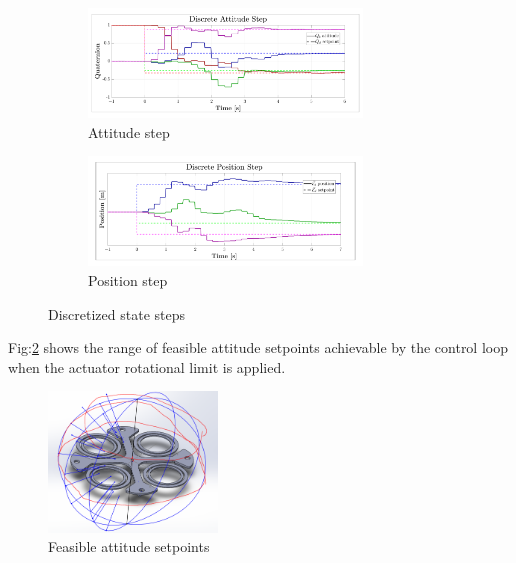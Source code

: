 \begin{figure}[hbtp]
\centering
\begin{subfigure}{\textwidth}
\centering
\includegraphics[width=0.8\textwidth]{graphs/discrete_attitude_step}
\vspace{-12pt}
\caption{Attitude step}
\end{subfigure}
\begin{subfigure}{\textwidth}
\vspace{-3pt}
\centering
\includegraphics[width=0.8\textwidth]{graphs/discrete_position_step}
\vspace{-12pt}
\caption{Position step}
\end{subfigure}
\vspace{-8pt}
\caption{Discretized state steps}
\label{fig:discrete_step}
\vspace{-12pt}
\end{figure}
\par
Fig:\ref{fig:feasible-attitude} shows the range of feasible attitude setpoints achievable by the control loop when the actuator rotational limit is applied.
\begin{figure}[htbp]
\centering
\includegraphics[width=0.4\textwidth]{figs/feasible-attitude}
\caption{Feasible attitude setpoints}
\label{fig:feasible-attitude}
\end{figure}